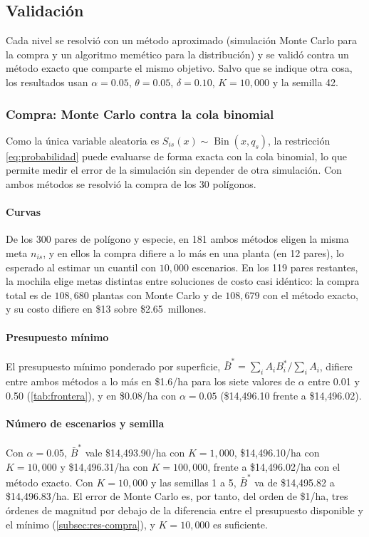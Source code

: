 \subsection{Validación}
\label{sec:validacion}

Cada nivel se resolvió con un método aproximado (simulación Monte Carlo para la compra y un algoritmo memético para la distribución) y se validó contra un método exacto que comparte el mismo objetivo. Salvo que se indique otra cosa, los resultados usan $\alpha=0.05$, $\theta=0.05$, $\delta=0.10$, $K=10{,}000$ y la semilla 42.

\subsubsection{Compra: Monte Carlo contra la cola binomial}
\label{subsec:val-compra}

Como la única variable aleatoria es $S_{is}(x)\sim\operatorname{Bin}(x,q_s)$, la restricción \eqref{eq:probabilidad} puede evaluarse de forma exacta con la cola binomial, lo que permite medir el error de la simulación sin depender de otra simulación. Con ambos métodos se resolvió la compra de los 30 polígonos.

\paragraph{Curvas} De los 300 pares de polígono y especie, en 181 ambos métodos eligen la misma meta $n_{is}$, y en ellos la compra difiere a lo más en una planta (en 12 pares), lo esperado al estimar un cuantil con $10{,}000$ escenarios. En los 119 pares restantes, la mochila elige metas distintas entre soluciones de costo casi idéntico: la compra total es de $108{,}680$ plantas con Monte Carlo y de $108{,}679$ con el método exacto, y su costo difiere en \$13 sobre \$2.65~millones.

\paragraph{Presupuesto mínimo} El presupuesto mínimo ponderado por superficie, $\bar{B}^{*}=\sum_iA_iB_i^{*}/\sum_iA_i$, difiere entre ambos métodos a lo más en \$1.6/ha para los siete valores de $\alpha$ entre 0.01 y 0.50 (\cref{tab:frontera}), y en \$0.08/ha con $\alpha=0.05$ (\$14{,}496.10 frente a \$14{,}496.02).

\paragraph{Número de escenarios y semilla} Con $\alpha=0.05$, $\bar{B}^{*}$ vale \$14{,}493.90/ha con $K=1{,}000$, \$14{,}496.10/ha con $K=10{,}000$ y \$14{,}496.31/ha con $K=100{,}000$, frente a \$14{,}496.02/ha con el método exacto. Con $K=10{,}000$ y las semillas 1 a 5, $\bar{B}^{*}$ va de \$14{,}495.82 a \$14{,}496.83/ha. El error de Monte Carlo es, por tanto, del orden de \$1/ha, tres órdenes de magnitud por debajo de la diferencia entre el presupuesto disponible y el mínimo (\cref{subsec:res-compra}), y $K=10{,}000$ es suficiente.

